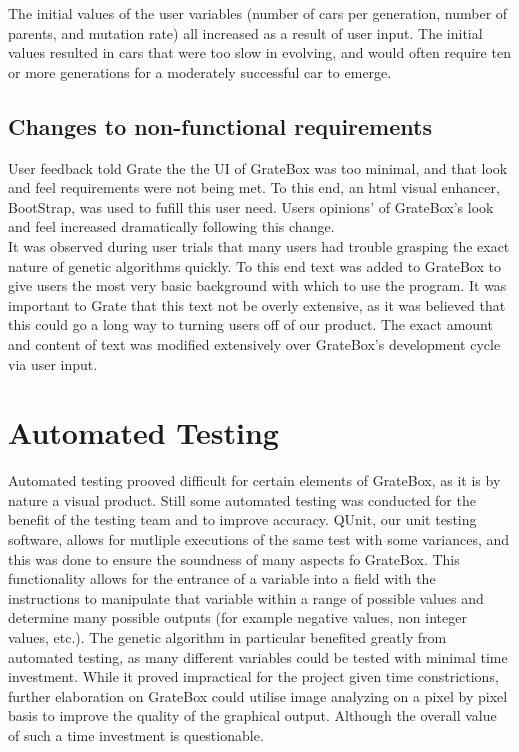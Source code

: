 \documentclass[12pt, titlepage]{article}
\begin{document}
The initial values of the user variables (number of cars per generation, number of parents, and mutation rate) all increased as a result of user input. The initial values resulted in cars that were too slow in evolving, and would often require ten or more generations for a moderately successful car to emerge. 

\subsection{Changes to non-functional requirements}

User feedback told Grate the the UI of GrateBox was too minimal, and that look and feel requirements were not being met. To this end, an html visual enhancer, BootStrap, was used to fufill this user need. Users opinions' of GrateBox's look and feel increased dramatically following this change.\\


It was observed during user trials that many users had trouble grasping the exact nature of genetic algorithms quickly. To this end text was added to GrateBox to give users the most very basic background with which to use the program. It was important to Grate that this text not be overly extensive, as it was believed that this could go a long way to turning users off of our product. The exact amount and content of text was modified extensively over GrateBox's development cycle via user input.

\section{Automated Testing}

Automated testing prooved difficult for certain elements of GrateBox, as it is by nature a visual product. Still some automated testing was conducted for the benefit of the testing team and to improve accuracy. QUnit, our unit testing software, allows for mutliple executions of the same test with some variances, and this was done to ensure the soundness of many aspects fo GrateBox. This functionality allows for the entrance of a variable into a field with the instructions to manipulate that variable within a range of possible values and determine many possible outputs (for example negative values, non integer values, etc.). The genetic algorithm in particular benefited greatly from automated testing, as many different variables could be tested with minimal time investment. While it proved impractical for the project given time constrictions, further elaboration on GrateBox could utilise image analyzing on a pixel by pixel basis to improve the quality of the graphical output. Although the overall value of such a time investment is questionable.
		
\end{document}
